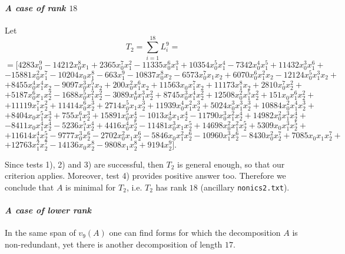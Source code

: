 \documentclass{amsart}
\theoremstyle{definition}
\begin{document}
\paragraph{\textit{A case of rank $18$}}  Let 
$$ T_{2} = \sum_{i=1}^{18} L_{i}^{9} = $$
{\small{$$ = [4283x_{0}^9-14212x_{0}^8x_{1}+2365x_{0}^7x_{1}^2-11335x_{0}^6x_{1}^3+10354x_{0}^5x_{1}^4-7342x_{0}^4x_{1}^5+11432x_{0}^3x_{1}^6+$$
$$-15881x_{0}^2x_{1}^7-10204x_{0}x_{1}^8-663x_{1}^9-10837x_{0}^8x_{2}-6573x_{0}^7x_{1}x_{2}+6070x_{0}^6x_{1}^2x_{2}-12124x_{0}^5x_{1}^3x_{2}+$$
$$+8455x_{0}^4x_{1}^4x_{2}-9097x_{0}^3x_{1}^5x_{2}+200x_{0}^2x_{1}^6x_{2}+11563x_{0}x_{1}^7x_{2}+11173x_{1}^8x_{2}+2810x_{0}^7x_{2}^2+\quad\quad\quad$$
$$+5187x_{0}^6x_{1}x_{2}^2-1688x_{0}^5x_{1}^2x_{2}^2-3089x_{0}^4x_{1}^3x_{2}^2+8745x_{0}^3x_{1}^4x_{2}^2+12508x_{0}^2x_{1}^5x_{2}^2+151x_{0}x_{1}^6x_{2}^2+\quad\quad$$
$$+11119x_{1}^7x_{2}^2+11414x_{0}^6x_{2}^3+2714x_{0}^5x_{1}x_{2}^3+11939x_{0}^4x_{1}^2x_{2}^3+5024x_{0}^3x_{1}^3x_{2}^3+10884x_{0}^2x_{1}^4x_{2}^3+\quad\quad$$
$$+8404x_{0}x_{1}^5x_{2}^3+755x_{1}^6x_{2}^3+15891x_{0}^5x_{2}^4-1013x_{0}^4x_{1}x_{2}^4-11790x_{0}^3x_{1}^2x_{2}^4+14982x_{0}^2x_{1}^3x_{2}^4+\quad\quad\quad$$
$$-8411x_{0}x_{1}^4x_{2}^4-5236x_{1}^5x_{2}^4+4416x_{0}^4x_{2}^5-11481x_{0}^3x_{1}x_{2}^5+14698x_{0}^2x_{1}^2x_{2}^5+5309x_{0}x_{1}^3x_{2}^5+\quad\quad\quad$$
$$+11614x_{1}^4x_{2}^5-9777x_{0}^3x_{2}^6-2702x_{0}^2x_{1}x_{2}^6-5846x_{0}x_{1}^2x_{2}^6-10960x_{1}^3x_{2}^6-8430x_{0}^2x_{2}^7+7085x_{0}x_{1}x_{2}^7+$$
$$+12763x_{1}^2x_{2}^7-14136x_{0}x_{2}^8-9808x_{1}x_{2}^8+9194x_{2}^9].\quad\quad\quad\quad\quad\quad\quad\quad\quad\quad\quad\quad\quad\quad\quad\quad\quad\quad$$}}

\noindent Since tests 1), 2) and 3) are successful, then $ T_{2} $ is general enough, so that our criterion applies. Moreover, test 4)  provides positive answer too. Therefore we conclude that $ A $ is minimal for $ T_{2} $, i.e. $T_2$ has rank $18$ (ancillary \texttt{nonics2.txt}). \\


\paragraph{\textit{A case of lower rank}} In the same span of $v_9(A)$ one can find forms for which the decomposition $A$ is non-redundant, yet there is another decomposition of length $17$.
\end{document}
